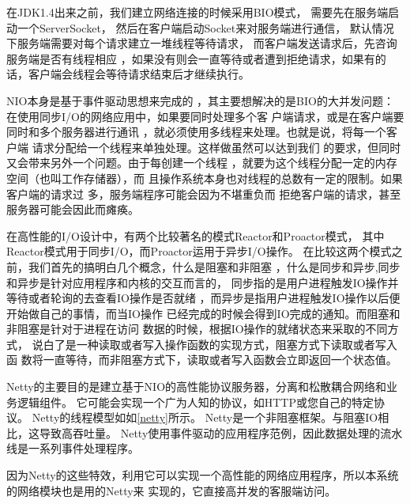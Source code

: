 在JDK1.4出来之前，我们建立网络连接的时候采用BIO模式，
需要先在服务端启动一个ServerSocket，
然后在客户端启动Socket来对服务端进行通信，
默认情况下服务端需要对每个请求建立一堆线程等待请求，
而客户端发送请求后，先咨询服务端是否有线程相应
，如果没有则会一直等待或者遭到拒绝请求，如果有的话，客户端会线程会等待请求结束后才继续执行。

NIO本身是基于事件驱动思想来完成的
，其主要想解决的是BIO的大并发问题：
 在使用同步I/O的网络应用中，如果要同时处理多个客
 户端请求，或是在客户端要同时和多个服务器进行通讯
 ，就必须使用多线程来处理。也就是说，将每一个客户端
 请求分配给一个线程来单独处理。这样做虽然可以达到我们
 的要求，但同时又会带来另外一个问题。由于每创建一个线程
 ，就要为这个线程分配一定的内存空间（也叫工作存储器），而
 且操作系统本身也对线程的总数有一定的限制。如果客户端的请求过
 多，服务端程序可能会因为不堪重负而
 拒绝客户端的请求，甚至服务器可能会因此而瘫痪。

在高性能的I/O设计中，有两个比较著名的模式Reactor和Proactor模式，
其中Reactor模式用于同步I/O，而Proactor运用于异步I/O操作。
在比较这两个模式之前，我们首先的搞明白几个概念，什么是阻塞和非阻塞
，什么是同步和异步,同步和异步是针对应用程序和内核的交互而言的，
同步指的是用户进程触发IO操作并等待或者轮询的去查看IO操作是否就绪
，而异步是指用户进程触发IO操作以后便开始做自己的事情，而当IO操作
已经完成的时候会得到IO完成的通知。而阻塞和非阻塞是针对于进程在访问
数据的时候，根据IO操作的就绪状态来采取的不同方式，
说白了是一种读取或者写入操作函数的实现方式，阻塞方式下读取或者写入函
数将一直等待，而非阻塞方式下，读取或者写入函数会立即返回一个状态值。

Netty的主要目的是建立基于NIO的高性能协议服务器，分离和松散耦合网络和业务逻辑组件。
它可能会实现一个广为人知的协议，如HTTP或您自己的特定协议。
Netty的线程模型如如\ref{netty}所示。
Netty是一个非阻塞框架。与阻塞IO相比，这导致高吞吐量。
Netty使用事件驱动的应用程序范例，因此数据处理的流水线是一系列事件处理程序。

因为Netty的这些特效，利用它可以实现一个高性能的网络应用程序，所以本系统的网络模块也是用的Netty来
实现的，它直接高并发的客服端访问。
